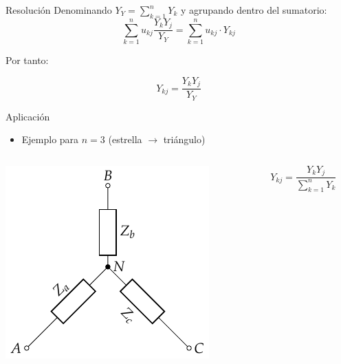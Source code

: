 \documentclass[aspectratio=169, usenames,svgnames,dvipsnames]{beamer}
\begin{document}
\begin{frame}[label={sec:org2009b9f}]{Resolución}
Denominando \(Y_Y = \sum_{k  = 1}^n Y_k\) y agrupando dentro del sumatorio:
\[
  \sum_{k = 1}^n u_{kj} \frac{Y_k Y_j}{Y_Y} = \sum_{k = 1}^n u_{kj} \cdot Y_{kj}  
\]

Por tanto:

\[
  \boxed{Y_{kj} = \frac{Y_k Y_j}{Y_Y}}
\]
\end{frame}

\begin{frame}[label={sec:orge606433}]{Aplicación}
\begin{itemize}
\item Ejemplo para \(n = 3\) (estrella \(\rightarrow\) triángulo)
\end{itemize}

\begin{columns}
\begin{column}{0.3\columnwidth}
\begin{center}
\includegraphics[height=0.5\textheight]{../figs/Impedancia_Estrella.pdf}
\end{center}
\end{column}

\begin{column}{0.3\columnwidth}
\[
  \boxed{Y_{kj} = \frac{Y_k Y_j}{\sum_{k  = 1}^n Y_k}}
\]


\end{column}
\end{columns}
\end{frame}
\end{document}
